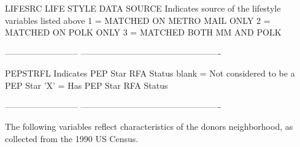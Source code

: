 \documentclass[
  11pt,
  a4paper,
  DIV=12,captions=tableheading,oneside,titlepage]{scrbook}
\let\oldverbatim\verbatim
\let\endoldverbatim\endverbatim
\renewenvironment{verbatim}{\footnotesize\oldverbatim}{\endoldverbatim}
\begin{document}
\begin{verbatim}
LIFESRC                     LIFE STYLE DATA SOURCE
                            Indicates source of the lifestyle variables listed 
                            above
                            1 = MATCHED ON METRO MAIL ONLY
                            2 = MATCHED ON POLK ONLY
                            3 = MATCHED BOTH MM AND POLK

--------------------------  -------------------------------------------------
                           
PEPSTRFL                    Indicates PEP Star RFA Status
                            blank = Not considered to be a PEP Star
                            'X'   = Has PEP Star RFA Status
                           
--------------------------  -------------------------------------------------
                           
                            The following variables reflect characteristics 
                            of the donors neighborhood, as collected from the 
                            1990 US Census.
                           

\end{verbatim}
\end{document}
